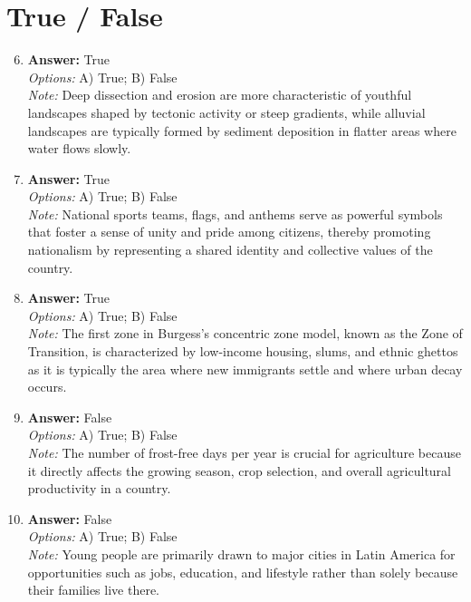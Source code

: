 \documentclass[12pt]{article}
\begin{document}
\section*{True / False}
\begin{enumerate}[label=\arabic*.]
\setcounter{enumi}{5}
\item \textbf{Answer:} True
\\ \textit{Options:} A) True; B) False
\\ \textit{Note:} Deep dissection and erosion are more characteristic of youthful landscapes shaped by tectonic activity or steep gradients, while alluvial landscapes are typically formed by sediment deposition in flatter areas where water flows slowly.
\item \textbf{Answer:} True
\\ \textit{Options:} A) True; B) False
\\ \textit{Note:} National sports teams, flags, and anthems serve as powerful symbols that foster a sense of unity and pride among citizens, thereby promoting nationalism by representing a shared identity and collective values of the country.
\item \textbf{Answer:} True
\\ \textit{Options:} A) True; B) False
\\ \textit{Note:} The first zone in Burgess's concentric zone model, known as the Zone of Transition, is characterized by low-income housing, slums, and ethnic ghettos as it is typically the area where new immigrants settle and where urban decay occurs.
\item \textbf{Answer:} False
\\ \textit{Options:} A) True; B) False
\\ \textit{Note:} The number of frost-free days per year is crucial for agriculture because it directly affects the growing season, crop selection, and overall agricultural productivity in a country.
\item \textbf{Answer:} False
\\ \textit{Options:} A) True; B) False
\\ \textit{Note:} Young people are primarily drawn to major cities in Latin America for opportunities such as jobs, education, and lifestyle rather than solely because their families live there.
\end{enumerate}
\end{document}
